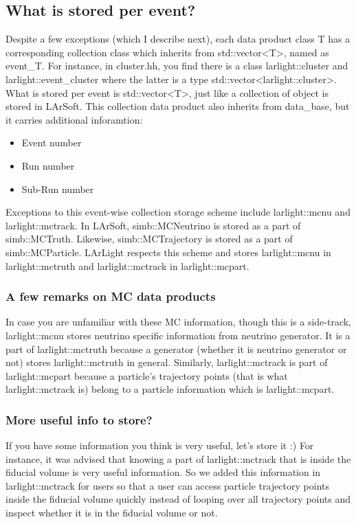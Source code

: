 \subsection{What is stored per event?}
Despite a few exceptions (which I describe next), each data product class {\ttfamily T} has a corresponding collection class which inherits from {\ttfamily std::vector<T>}, named as {\ttfamily event\_T}. 
For instance, in {\ttfamily cluster.hh}, you find there is a class {\ttfamily larlight::cluster} and {\ttfamily larlight::event\_cluster} where the latter is a type {\ttfamily std::vector<larlight::cluster>}. What is stored per event is {\ttfamily std::vector<T>}, just like a collection of object is stored in LArSoft. This collection data product also inherits from {\ttfamily data\_base}, but it carries additional inforamtion:
\begin{itemize}
\item Event number
\item Run number
\item Sub-Run number
\end{itemize}

Exceptions to this event-wise collection storage scheme include {\ttfamily larlight::mcnu} and {\ttfamily larlight::mctrack}.
In LArSoft, {\ttfamily simb::MCNeutrino} is stored as a part of {\ttfamily simb::MCTruth}. Likewise, {\ttfamily simb::MCTrajectory} is stored as a part of {\ttfamily simb::MCParticle}. LArLight respects this scheme and stores {\ttfamily larlight::mcnu} in {\ttfamily larlight::mctruth} and {\ttfamily larlight::mctrack} in {\ttfamily larlight::mcpart}.

\subsubsection{A few remarks on MC data products}
In case you are unfamiliar with these MC information, though this is a side-track, {\ttfamily larlight::mcnu} stores neutrino specific information from neutrino generator. It is a part of {\ttfamily larlight::mctruth} because a generator (whether it is neutrino generator or not) stores {\ttfamily larlight::mctruth} in general. Similarly, {\ttfamily larlight::mctrack} is part of {\ttfamily larlight::mcpart} because a particle's trajectory points (that is what {\ttfamily larlight::mctrack} is) belong to a particle information which is {\ttfamily larlight::mcpart}.

\subsubsection{More useful info to store?}
If you have some information you think is very useful, let's store it :)
For instance, it was advised that knowing a part of {\ttfamily larlight::mctrack} that is inside the fiducial volume is very useful information.
So we added this information in {\ttfamily larlight::mctrack} for users so that a user can access particle trajectory points inside the fiducial volume quickly instead of looping over all trajectory points and inspect whether it is in the fiducial volume or not.

